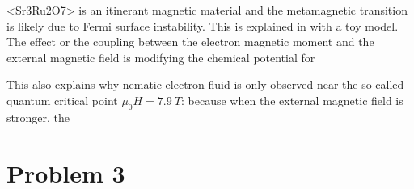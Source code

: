 \documentclass[hyperref, a4paper]{article}
\def\ce#1{<#1>}%
\begin{document}
\ce{Sr3Ru2O7} is an itinerant magnetic material 
and the metamagnetic transition 
is likely due to Fermi surface instability.
This is explained in \cite{kee2005itinerant} with a toy model.
The effect or the coupling between the electron magnetic moment 
and the external magnetic field 
is modifying the chemical potential for 

This also explains why nematic electron fluid 
is only observed near the so-called quantum critical point 
$\mu_0 H = \SI{7.9}{T}$:
because when the external magnetic field is stronger, 
the 


\section{Problem 3}

\subsection{}



\printbibliography
\end{document}
